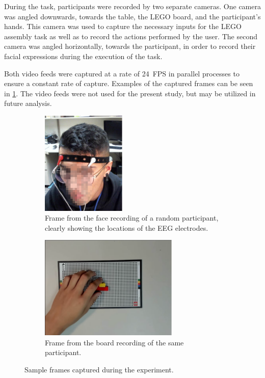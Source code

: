 \documentclass[10pt,letterpaper]{article}
\providecommand{\DIFdeltex}[1]{} %
\providecommand{\DIFdelbegin}{\protect\color{red}} %
\providecommand{\DIFdelend}{\protect\color{black}} %
\providecommand{\DIFdel}[1]{\texorpdfstring{\DIFdeltex{#1}}{}} %
\newcommand{\DIFscaledelfig}{0.5}
\newlength{\DIFdelgraphicswidth} %
\newlength{\DIFdelgraphicsheight} %
\newcommand{\DIFdelincludegraphics}[2][]{%
\sbox{\DIFdelgraphicsbox}{\DIFOincludegraphics[#1]{#2}}%
\settoboxwidth{\DIFdelgraphicswidth}{\DIFdelgraphicsbox} %
\settoboxtotalheight{\DIFdelgraphicsheight}{\DIFdelgraphicsbox} %
\scalebox{\DIFscaledelfig}{%
\parbox[b]{\DIFdelgraphicswidth}{\usebox{\DIFdelgraphicsbox}\\[-\baselineskip] \rule{\DIFdelgraphicswidth}{0em}}\llap{\resizebox{\DIFdelgraphicswidth}{\DIFdelgraphicsheight}{%
\setlength{\unitlength}{\DIFdelgraphicswidth}%
\begin{picture}(1,1)%
\thicklines\linethickness{2pt} %
{\color[rgb]{1,0,0}\put(0,0){\framebox(1,1){}}}%
{\color[rgb]{1,0,0}\put(0,0){\line( 1,1){1}}}%
{\color[rgb]{1,0,0}\put(0,1){\line(1,-1){1}}}%
\end{picture}%
}\hspace*{3pt}}} %
} %
\DeclareRobustCommand{\DIFdelbegin}{\DIFOdelbegin \let\includegraphics\DIFdelincludegraphics} %
\DeclareRobustCommand{\DIFdelend}{\DIFOaddend \let\includegraphics\DIFOincludegraphics} %
\begin{document}
During the task, participants were recorded by two separate cameras.
One camera was angled downwards, towards the table, the LEGO board, and the participant's hands.
This camera was used to capture the necessary inputs for the LEGO assembly task as well as to record the actions performed by the user.
The second camera was angled horizontally, towards the participant, in order to record their facial expressions during the execution of the task.

Both video feeds were captured at a rate of \num{24}~FPS \DIFdelbegin \DIFdel{(i.e.\ with a sampling interval of \( \SI[parse-numbers=false,per-mode=symbol]{41.\overline{6}}{\milli\second} \)) }\DIFdelend in parallel processes to ensure a constant rate of capture.
Examples of the captured frames can be seen in \cref{fig:sampleframes}.
The video feeds were not used for the present study, but may be utilized in future analysis.

\begin{figure}[h]
  \centering
  \begin{subfigure}[t]{.35\textwidth}
    \centering
    \includegraphics[height=140pt]{images/participant.eps}
    \caption{Frame from the face recording of a random participant, clearly showing the locations of the EEG electrodes.}
  \end{subfigure}%
  \hfill%
  \begin{subfigure}[t]{.60\textwidth}
    \centering
    \includegraphics[height=140pt]{images/board_and_hand.eps}
    \caption{Frame from the board recording of the same participant.}
  \end{subfigure}
  \caption{Sample frames captured during the experiment.}\label{fig:sampleframes}
\end{figure}
\end{document}
